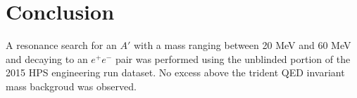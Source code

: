 
\chapter{Conclusion}

A resonance search for an $A'$ with a mass ranging between 20 MeV and 60
MeV and decaying to an $e^+e^-$ pair was performed using the unblinded
portion of the 2015 HPS engineering run dataset. No excess above the 
trident QED invariant mass backgroud was observed.  
